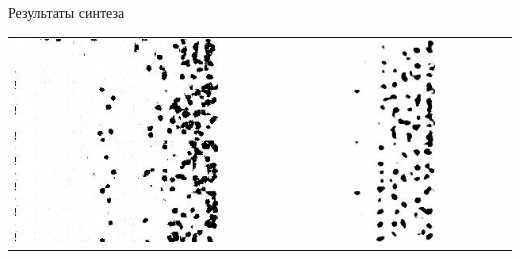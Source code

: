 \documentclass[12pt]{beamer}
\begin{document}
\begin{frame}{Результаты синтеза}
\begin{table}
\begin{center}
\begin{tabular}{p{1.2cm} p{1.2cm} p{1.2cm} p{1.2cm} p{1.2cm} p{1.2cm} p{1.2cm}}
					\includegraphics[width=1\linewidth]{8-results/sand-trend2/nf16/gen1}
					&
					\includegraphics[width=1\linewidth]{8-results/sand-trend2/nf16_woUnet/gen1}
					&

\end{tabular}
\end{center}
\end{table}
\end{frame}
\end{document}
